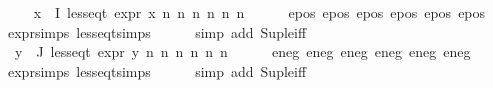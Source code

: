 \begin{isabellebody}
\isanewline
\isanewline
\ \ \isamarkupfalse%
\ {\isachardoublequoteopen}{\isasymforall}x{\isasymin}{\isasymPhi}\ {\isacharbackquote}{\kern0pt}\ I{\isachardot}{\kern0pt}\ less{\isacharunderscore}{\kern0pt}eq{\isacharunderscore}{\kern0pt}t\ {\isacharparenleft}{\kern0pt}expr\ x{\isacharparenright}{\kern0pt}\ {\isacharparenleft}{\kern0pt}n{}{\isacharcomma}{\kern0pt}\ n{}{\isacharcomma}{\kern0pt}\ n{}{\isacharcomma}{\kern0pt}\ n{}{\isacharcomma}{\kern0pt}\ n{}{\isacharcomma}{\kern0pt}\ n{}{\isacharparenright}{\kern0pt}{\isachardoublequoteclose}\isanewline
\ \ \ \ \isamarkupfalse%
\ e{}{\isacharunderscore}{\kern0pt}pos\ e{}{\isacharunderscore}{\kern0pt}pos\ e{}{\isacharunderscore}{\kern0pt}pos\ e{}{\isacharunderscore}{\kern0pt}pos\ e{}{\isacharunderscore}{\kern0pt}pos\ e{}{\isacharunderscore}{\kern0pt}pos\isanewline
expr{\isachardot}{\kern0pt}simps\ less{\isacharunderscore}{\kern0pt}eq{\isacharunderscore}{\kern0pt}t{\isachardot}{\kern0pt}simps\isanewline
\ \ \ \ \isamarkupfalse%
\ {\isacharparenleft}{\kern0pt}simp\ add{\isacharcolon}{\kern0pt}\ Sup{\isacharunderscore}{\kern0pt}le{\isacharunderscore}{\kern0pt}iff{\isacharparenright}{\kern0pt}\isanewline
\isanewline
\ \ \isamarkupfalse%
\ {\isachardoublequoteopen}{\isasymforall}y{\isasymin}{\isasymPhi}\ {\isacharbackquote}{\kern0pt}\ J{\isachardot}{\kern0pt}\ less{\isacharunderscore}{\kern0pt}eq{\isacharunderscore}{\kern0pt}t\ {\isacharparenleft}{\kern0pt}expr\ y{\isacharparenright}{\kern0pt}\ {\isacharparenleft}{\kern0pt}n{}{\isacharcomma}{\kern0pt}\ n{}{\isacharcomma}{\kern0pt}\ n{}{\isacharcomma}{\kern0pt}\ n{}{\isacharcomma}{\kern0pt}\ n{}{\isacharcomma}{\kern0pt}\ n{}{\isacharparenright}{\kern0pt}{\isachardoublequoteclose}\isanewline
\ \ \ \ \isamarkupfalse%
\ e{}{\isacharunderscore}{\kern0pt}neg\ e{}{\isacharunderscore}{\kern0pt}neg\ e{}{\isacharunderscore}{\kern0pt}neg\ e{}{\isacharunderscore}{\kern0pt}neg\ e{}{\isacharunderscore}{\kern0pt}neg\ e{}{\isacharunderscore}{\kern0pt}neg\isanewline
expr{\isachardot}{\kern0pt}simps\ less{\isacharunderscore}{\kern0pt}eq{\isacharunderscore}{\kern0pt}t{\isachardot}{\kern0pt}simps\isanewline
\ \ \ \ \isamarkupfalse%
\ {\isacharparenleft}{\kern0pt}simp\ add{\isacharcolon}{\kern0pt}\ Sup{\isacharunderscore}{\kern0pt}le{\isacharunderscore}{\kern0pt}iff{\isacharparenright}{\kern0pt}\isanewline
{}\isamarkupfalse%
\isanewline
\isanewline
\isanewline
%
\endisatagproof
{\isafoldproof}%
%
\isadelimproof
%
\endisadelimproof
%
\isadelimtheory
%
\endisadelimtheory
%
\isatagtheory
%
\endisatagtheory
{\isafoldtheory}%
%
\isadelimtheory
%
\endisadelimtheory
%
\end{isabellebody}%
